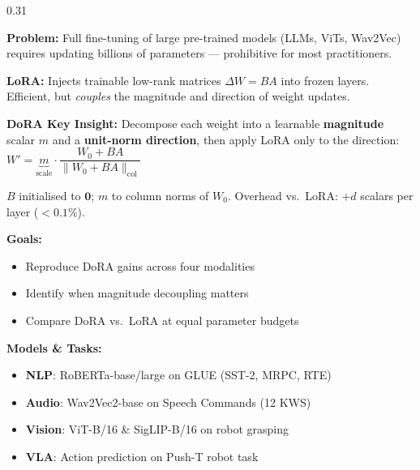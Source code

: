 \documentclass[final]{beamer}
\newcommand{\hl}[1]{\textcolor{CornellRed}{\textbf{#1}}}
\newcommand{\lb}[1]{\textbf{#1:}\;}
\begin{document}
\begin{frame}[t]
\vspace{0.2cm}

\begin{columns}[T,totalwidth=\textwidth]
\setlength{\columnsep}{0.8cm}

\begin{column}{0.31\textwidth}

\begin{tcolorbox}[posterblock,title=Background \& Motivation]
  \lb{Problem} Full fine-tuning of large pre-trained models
  (LLMs, ViTs, Wav2Vec) requires updating billions of parameters
  — prohibitive for most practitioners.

  \vspace{0.12cm}
  \lb{LoRA} Injects trainable low-rank matrices $\Delta W = BA$
  into frozen layers.  Efficient, but \emph{couples} the magnitude
  and direction of weight updates.

  \vspace{0.12cm}
  \lb{DoRA Key Insight} Decompose each weight into a learnable
  \hl{magnitude} scalar $m$ and a \hl{unit-norm direction}, then
  apply LoRA only to the direction:
  $\displaystyle W' = \underbrace{m}_{\text{scale}}
    \cdot \dfrac{W_0+BA}{\|W_0+BA\|_{\mathrm{col}}}$

  \vspace{0.04cm}
  $B$ initialised to $\mathbf{0}$; $m$ to column norms of $W_0$.
  Overhead vs.\ LoRA: $+d$ scalars per layer ($<0.1\%$).

  \vspace{0.12cm}
  \lb{Goals}
  \begin{itemize}
    \item Reproduce DoRA gains across four modalities
    \item Identify when magnitude decoupling matters
    \item Compare DoRA vs.\ LoRA at equal parameter budgets
  \end{itemize}
\end{tcolorbox}

\begin{tcolorbox}[posterblock,title=Methodology]
  \lb{Models \& Tasks}
  \begin{itemize}
    \item \textbf{NLP}: RoBERTa-base/large on GLUE (SST-2, MRPC, RTE)
    \item \textbf{Audio}: Wav2Vec2-base on Speech Commands (12 KWS)
    \item \textbf{Vision}: ViT-B/16 \& SigLIP-B/16 on robot grasping
    \item \textbf{VLA}: Action prediction on Push-T robot task
  \end{itemize}


\end{tcolorbox}
\end{column}
\end{columns}
\end{frame}
\end{document}
